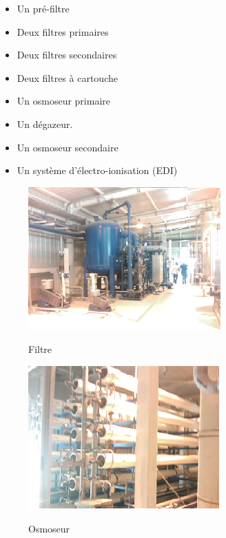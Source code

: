 \begin{itemize}
\item Un pré-filtre
\item	Deux filtres primaires
\item	Deux filtres secondaires
\item Deux filtres à cartouche
\item Un osmoseur  primaire
\item	Un dégazeur.
\item Un osmoseur secondaire 
\item	Un système d'électro-ionisation (EDI)
\end{itemize}	
\begin{figure}

  \begin{minipage}[t]{7cm}
        \centering
	\includegraphics[scale=0.9]{./Figures/filtre.png}
		\label{fig:filtre}
		\caption{Filtre}
    \end{minipage}
    \begin{minipage}[t]{8cm}
        \centering
\includegraphics[scale=0.9]{./Figures/osmoseur.png}

	\label{fig:osmoseur}
			\caption{Osmoseur}

    \end{minipage}
\end{figure}

